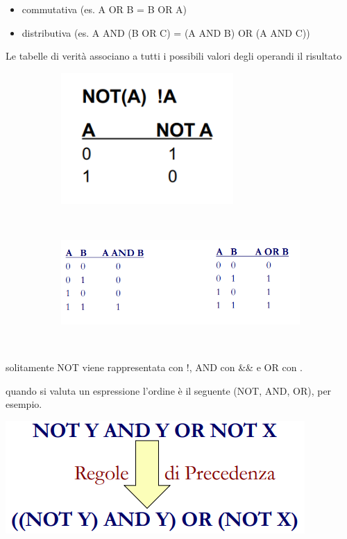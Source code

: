 \documentclass[
  paper=a4,
  oneside  ,captions=tableheading
]{scrbook}
\providecommand{\tightlist}{%
  \setlength{\itemsep}{0pt}\setlength{\parskip}{0pt}}
\begin{document}
\begin{itemize}
\tightlist
\item
  commutativa (es. A OR B = B OR A)
\item
  distributiva (es. A AND (B OR C) = (A AND B) OR (A AND C))
\end{itemize}

Le tabelle di verità associano a tutti i possibili valori degli operandi
il risultato

\begin{figure}[h]
\begin{subfigure}{0.5\textwidth}
\includegraphics[width=0.9\linewidth, height=5cm]{./image/image-20201207220212631-1607774144622.png}
\end{subfigure}
\begin{subfigure}{0.5\textwidth}
\includegraphics[width=0.9\linewidth, height=5cm]{./image/image-20201207220252086-1607774220882.png}
\end{subfigure}
\end{figure}

solitamente NOT viene rappresentata con !, AND con \&\& e OR con
\textbar\textbar.

quando si valuta un espressione l'ordine è il seguente (NOT, AND, OR),
per esempio.

\begin{center}
\includegraphics{./image/image-20201207220627893.png}
\end{center}
\end{document}
